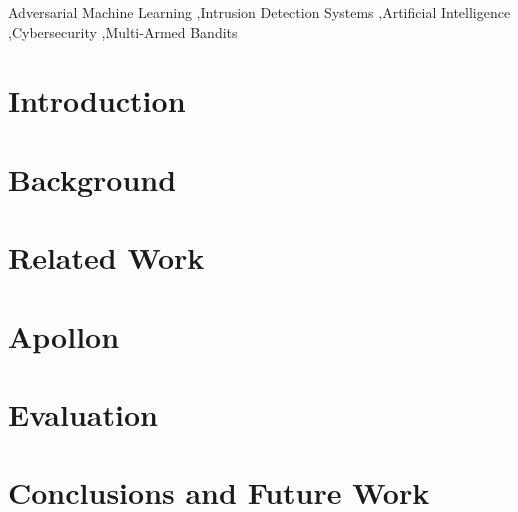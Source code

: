 \documentclass[a4paper,fleqn]{cas-dc}
\begin{document}
    \begin{keywords}
        Adversarial Machine Learning \sep Intrusion Detection Systems \sep Artificial Intelligence \sep Cybersecurity
        \sep Multi-Armed Bandits
    \end{keywords}


    \maketitle



    \section{Introduction}\label{sec:introduction}
    



    \section{Background}\label{sec:background}
    



    \section{Related Work}\label{sec:related-work}
    
    



    \section{Apollon}\label{sec:proposal}
    



    \section{Evaluation}\label{sec:evaluation}
    



    \section{Conclusions and Future Work}\label{sec:conclusions-and-future-work}
    


    
    



\end{document}
